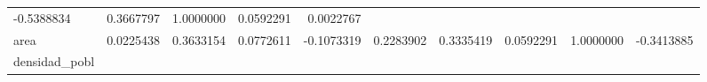 \documentclass[]{article}
\begin{document}
\begin{longtable}[]{@{}lrrrrrrrrr@{}}
\begin{minipage}[t]{0.07\columnwidth}
-0.5388834\strut
\end{minipage} & \begin{minipage}[t]{0.07\columnwidth}\raggedleft\strut
0.3667797\strut
\end{minipage} & \begin{minipage}[t]{0.07\columnwidth}\raggedleft\strut
1.0000000\strut
\end{minipage} & \begin{minipage}[t]{0.07\columnwidth}\raggedleft\strut
0.0592291\strut
\end{minipage} & \begin{minipage}[t]{0.09\columnwidth}\raggedleft\strut
0.0022767\strut
\end{minipage}\tabularnewline
\begin{minipage}[t]{0.09\columnwidth}\raggedright\strut
area\strut
\end{minipage} & \begin{minipage}[t]{0.07\columnwidth}\raggedleft\strut
0.0225438\strut
\end{minipage} & \begin{minipage}[t]{0.07\columnwidth}\raggedleft\strut
0.3633154\strut
\end{minipage} & \begin{minipage}[t]{0.09\columnwidth}\raggedleft\strut
0.0772611\strut
\end{minipage} & \begin{minipage}[t]{0.07\columnwidth}\raggedleft\strut
-0.1073319\strut
\end{minipage} & \begin{minipage}[t]{0.07\columnwidth}\raggedleft\strut
0.2283902\strut
\end{minipage} & \begin{minipage}[t]{0.07\columnwidth}\raggedleft\strut
0.3335419\strut
\end{minipage} & \begin{minipage}[t]{0.07\columnwidth}\raggedleft\strut
0.0592291\strut
\end{minipage} & \begin{minipage}[t]{0.07\columnwidth}\raggedleft\strut
1.0000000\strut
\end{minipage} & \begin{minipage}[t]{0.09\columnwidth}\raggedleft\strut
-0.3413885\strut
\end{minipage}\tabularnewline
\begin{minipage}[t]{0.09\columnwidth}\raggedright\strut
densidad\_pobl\strut
\end{minipage} & \begin{minipage}[t]{0.07\columnwidth}\raggedleft\strut

\end{minipage}
\end{longtable}
\end{document}
